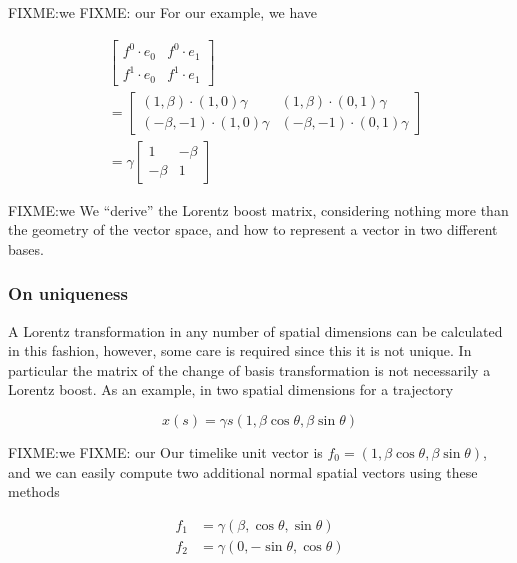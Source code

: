 FIXME:we
FIXME: our
For our example, we have

\begin{equation}\label{eqn:grahamSchmidtLorentz:740}
\begin{aligned}
&\begin{bmatrix}
f^0 \cdot e_0 & f^0 \cdot e_1 \\
f^1 \cdot e_0 & f^1 \cdot e_1
\end{bmatrix} \\
&=
\begin{bmatrix}
( 1, \beta )
\cdot
(1, 0)
\gamma &
( 1, \beta )
\cdot
(0, 1)
\gamma \\
( -\beta, -1)
\cdot
(1, 0)
\gamma &
( -\beta, -1)
\cdot
(0, 1)
\gamma
\end{bmatrix} \\
&=
\gamma
\begin{bmatrix}
1 & - \beta \\
- \beta & 1
\end{bmatrix}
\end{aligned}
\end{equation}

FIXME:we
We ``derive'' the Lorentz boost matrix, considering nothing more than the geometry of the vector space, and how to represent a vector in two different bases.

\subsubsection{On uniqueness}

A Lorentz transformation in any number of spatial dimensions can be calculated in this fashion, however, some care is required since this it is not unique.  In particular the matrix of the change of basis transformation is not necessarily a Lorentz boost.  As an example, in two spatial dimensions for a trajectory

\begin{equation}\label{eqn:grahamSchmidtLorentz:800}
x(s) = \gamma s ( 1, \beta \cos\theta, \beta \sin\theta)
\end{equation}

FIXME:we
FIXME: our
Our timelike unit vector is $f_0 = ( 1, \beta \cos\theta, \beta \sin\theta )$, and we can easily compute two additional normal spatial vectors using these methods

\begin{align}\label{eqn:grahamSchmidtLorentz:820}
f_1 &= \gamma ( \beta, \cos\theta, \sin\theta ) \\
f_2 &= \gamma ( 0, -\sin\theta, \cos\theta )
\end{align}

